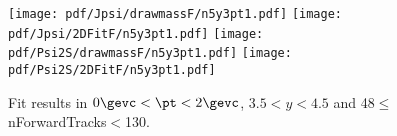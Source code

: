 \begin{figure}[H]
\begin{center}
\texttt{[image: pdf/Jpsi/drawmassF/n5y3pt1.pdf]}
\texttt{[image: pdf/Jpsi/2DFitF/n5y3pt1.pdf]}
\vspace*{-0.5cm}
\texttt{[image: pdf/Psi2S/drawmassF/n5y3pt1.pdf]}
\texttt{[image: pdf/Psi2S/2DFitF/n5y3pt1.pdf]}
\vspace*{-0.5cm}
\end{center}
\caption{Fit results in $0\gevc<\pt<2\gevc$, $3.5<y<4.5$ and 48$\leq$nForwardTracks$<$130.}
\label{Fitn5y3pt1}
\end{figure}
